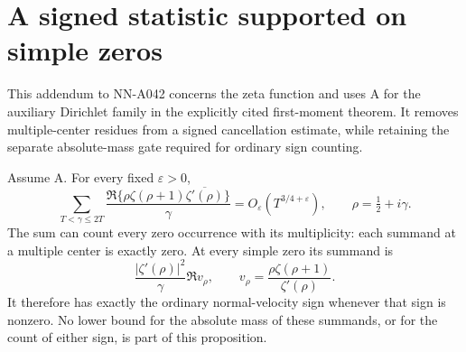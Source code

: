 \section{A signed statistic supported on simple zeros}
\label{sec:A042-simple-signed-cancellation}

This addendum to NN-A042 concerns the zeta function and uses A
for the auxiliary Dirichlet family in the explicitly cited
first-moment theorem. It removes multiple-center residues from
a signed cancellation estimate, while retaining the separate
absolute-mass gate required for ordinary sign counting.

\begin{proposition}
Assume A. For every fixed $\varepsilon>0$,
\begin{equation}\label{eq:A042-simple-cancellation}
 \sum_{T<\gamma\le2T}
 \frac{\Re\{\rho\zeta(\rho+1)\overline{\zeta'(\rho)}\}}{\gamma}
       =O_\varepsilon(T^{3/4+\varepsilon}),
 \qquad \rho=\tfrac12+i\gamma.
\end{equation}
The sum can count every zero occurrence with its multiplicity:
each summand at a multiple center is exactly zero. At every
simple zero its summand is
\[
                  \frac{|\zeta'(\rho)|^2}{\gamma}\Re v_\rho,
 \qquad v_\rho=\frac{\rho\zeta(\rho+1)}{\zeta'(\rho)}.
\]
It therefore has exactly the ordinary normal-velocity sign
whenever that sign is nonzero. No lower bound for the absolute
mass of these summands, or for the count of either sign, is
part of this proposition.
\end{proposition}

